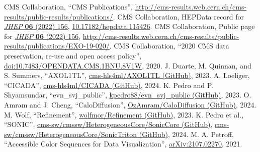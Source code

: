 \begin{thebibliography}{99}
 CMS Collaboration, ``CMS Publications'', \href{http://cms-results.web.cern.ch/cms-results/public-results/publications/}{http://cms-results.web.cern.ch/cms-results/public-results/publications/}.
 CMS Collaboration, HEPData record for \href{https://doi.org/10.1007/JHEP06(2022)156}{\textit{JHEP} \textbf{06} (2022) 156}, \href{https://doi.org/10.17182/hepdata.115426}{10.17182/hepdata.115426}.
 CMS Collaboration, Public page for \href{https://doi.org/10.1007/JHEP06(2022)156}{\textit{JHEP} \textbf{06} (2022) 156}, \href{http://cms-results.web.cern.ch/cms-results/public-results/publications/EXO-19-020/}{http://cms-results.web.cern.ch/cms-results/public-results/publications/EXO-19-020/}.
 CMS Collaboration, ``2020 CMS data preservation, re-use and open access policy'', \href{http://doi.org/10.7483/OPENDATA.CMS.1BNU.8V1W}{doi:10.7483/OPENDATA.CMS.1BNU.8V1W}, 2020.
 J. Duarte, M. Quinnan, and S. Summers, ``AXOL1TL'', \href{https://github.com/cms-hls4ml/AXOL1TL}{cms-hls4ml/AXOL1TL (GitHub)}, 2023.
 A. Loeliger, ``CICADA'', \href{https://github.com/cms-hls4ml/CICADA}{cms-hls4ml/CICADA (GitHub)}, 2024.
 K. Pedro and P. Shyamsundar, ``evn\_svj\_public'', \href{https://github.com/kpedro88/evn_svj_public}{kpedro88/evn\_svj\_public (GitHub)}, 2023.
 O. Amram and J. Cheng, ``CaloDiffusion'', \href{https://github.com/OzAmram/CaloDiffusion}{OzAmram/CaloDiffusion (GitHub)}, 2024.
 M. Wolf, ``Refinement'', \href{https://github.com/wolfmor/Refinement}{wolfmor/Refinement (GitHub)}, 2023.
 K. Pedro et al., ``SONIC'', \href{https://github.com/cms-sw/cmssw/tree/master/HeterogeneousCore/SonicCore}{cms-sw/cmssw/HeterogeneousCore/SonicCore (GitHub)}, \href{https://github.com/cms-sw/cmssw/tree/master/HeterogeneousCore/SonicTriton}{cms-sw/cmssw/HeterogeneousCore/SonicTriton (GitHub)}, 2024.
 M. A. Petroff, ``Accessible Color Sequences for Data Visualization'', \href{https://arxiv.org/abs/2107.02270}{arXiv:2107.02270}, 2021.
\end{thebibliography}
